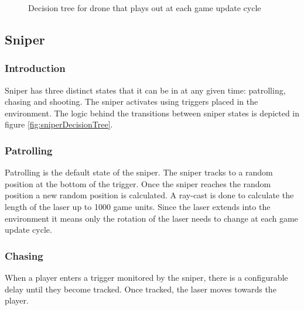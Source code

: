 \documentclass[11pt,a4paper]{article}
\begin{document}
\begin{figure}[H]
    \caption{Decision tree for drone that plays out at each game update cycle}
    \label{fig:droneDesisionTree}
\end{figure}
\subsection{Sniper}
\subsubsection{Introduction}
Sniper has three distinct states that it can be in at any given time: patrolling, chasing and shooting. The sniper activates using triggers placed in the environment. The logic behind the transitions between sniper states is depicted in figure \ref{fig:sniperDecisionTree}.
\subsubsection{Patrolling}
Patrolling is the default state of the sniper. The sniper tracks to a random position at the bottom of the trigger. Once the sniper reaches the random position a new random position is calculated. A ray-cast is done to calculate the length of the laser up to 1000 game units. Since the laser extends into the environment it means only the rotation of the laser needs to change at each game update cycle.
\subsubsection{Chasing}
When a player enters a trigger monitored by the sniper, there is a configurable delay until they become tracked. Once tracked, the laser moves towards the player.
\end{document}

